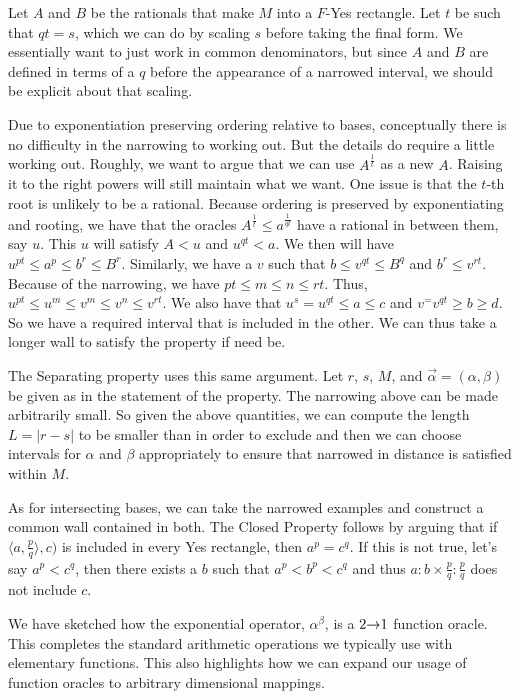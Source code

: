 \documentclass[12pt]{article}
\begin{document}
Let $A$ and $B$ be the rationals that make $M$ into a $F$-Yes rectangle. Let $t$ be such that $qt = s$, which we can do by scaling $s$ before taking the final form. We essentially want to just work in common denominators, but since $A$ and $B$ are defined in terms of a $q$ before the appearance of a narrowed interval, we should be explicit about that scaling. 

Due to exponentiation preserving ordering relative to bases, conceptually there is no difficulty in the narrowing to working out. But the details do require a little working out. Roughly, we want to argue that we can use $A^{\frac{1}{t}}$ as a new $A$. Raising it to the right powers will still maintain what we want. One issue is that the $t$-th root is unlikely to be a rational. Because ordering is preserved by exponentiating and rooting, we have that the oracles $A^{\frac{1}{t}} \leq a^{\frac{1}{qt}}$ have a rational in between them, say $u$. This $u$ will satisfy $A < u$ and $u^{qt}< a$.  We then will have $u^{pt} \leq a^p \leq b^r \leq B^r$. Similarly, we have a $v$ such that $b \leq v^{qt} \leq B^q $ and $b^r \leq v^{rt}$. Because of the narrowing, we have $pt \leq m \leq n \leq rt$. Thus, $u^{pt} \leq u^{m} \leq v^{m} \leq v^{n} \leq v^{rt}$. We also have that $u^s = u^{qt} \leq a \leq c$ and $v^= v^{qt} \geq b \geq d$. So we have a required interval that is included in the other.  We can thus take a longer wall to satisfy the property if need be. 

The Separating property uses this same argument. Let $r$, $s$, $M$, and $\vec{\alpha}= (\alpha, \beta)$ be given as in the statement of the property. The narrowing above can be made arbitrarily small. So given the above quantities, we can compute the length $L = |r-s|$ to be smaller than in order to exclude and then we can choose intervals for $\alpha$ and $\beta$ appropriately to ensure that narrowed in distance is satisfied within $M$.   

As for intersecting bases, we can take the narrowed examples and  construct a common wall contained in both. The Closed Property follows by arguing that if $\langle a, \frac{p}{q}\rangle, c)$ is included in every Yes rectangle, then  $a^p = c^q$. If this is not true, let's say $a^p < c^q$, then there exists a $b$ such that $a^p < b^p < c^q$ and thus $a:b \times \frac{p}{q}:\frac{p}{q}$ does not include $c$. 

We have sketched how the exponential operator, $\alpha^\beta$, is a $2\mathord{\rightarrow} 1$ function oracle. This completes the standard arithmetic operations we typically use with elementary functions. This also highlights how we can expand our usage of function oracles to arbitrary dimensional mappings. 
\end{document}
